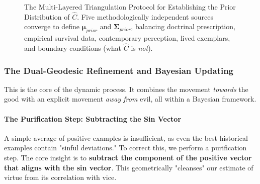 \documentclass[11pt,a4paper]{article}
\theoremstyle{definition}
\theoremstyle{remark}
\begin{document}
\begin{small}
\begin{figure}[h!]
    \caption{The Multi-Layered Triangulation Protocol for Establishing the Prior Distribution of \(\hat{C}\). Five methodologically independent sources converge to define \(\boldsymbol{\mu}_{prior}\) and \(\boldsymbol{\Sigma}_{prior}\), balancing doctrinal prescription, empirical survival data, contemporary perception, lived exemplars, and boundary conditions (what \(\hat{C}\) is \textit{not}).}
    \label{fig:prior_triangulation}
\end{figure}

\subsubsection{The Dual-Geodesic Refinement and Bayesian Updating}

This is the core of the dynamic process. It combines the movement \textit{towards} the good with an explicit movement \textit{away from} evil, all within a Bayesian framework.

\paragraph{The Purification Step: Subtracting the Sin Vector}

A simple average of positive examples is insufficient, as even the best historical examples contain "sinful deviations." To correct this, we perform a purification step. The core insight is to \textbf{subtract the component of the positive vector that aligns with the sin vector}. This geometrically "cleanses" our estimate of virtue from its correlation with vice.


\end{small}
\end{document}
